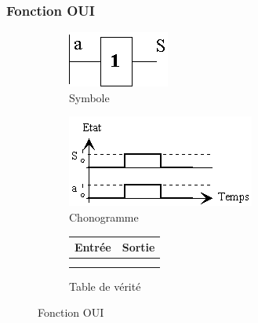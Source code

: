 \documentclass[10pt,fleqn]{article} %
\begin{document}
\subsubsection{Fonction OUI}
\begin{figure}[ht]
  \begin{subfigure}{.2\textwidth}
    \includegraphics[width=\textwidth]{images/oui_symb}
    \caption{Symbole}
    \centering
  \end{subfigure}
  \begin{subfigure}{.4\textwidth}
    \centering
    \includegraphics[width=\textwidth]{images/oui_chrono}
    \caption{Chonogramme}
  \end{subfigure}
  \begin{subfigure}{.33\textwidth}
    \centering
    \begin{tabular}{|c|c|}
      \hline
      \textbf{Entrée}& \textbf{Sortie} \\
      \hline
       & \\ \hline
       & \\ \hline
    \end{tabular}
    \caption{Table de vérité}
  \end{subfigure}
  \caption{Fonction OUI}
\end{figure}
\end{document}

